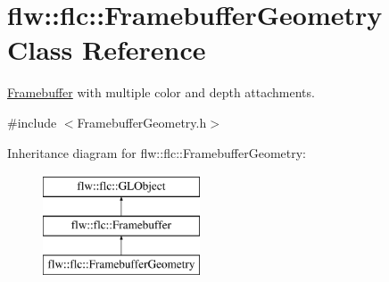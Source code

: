 \hypertarget{classflw_1_1flc_1_1FramebufferGeometry}{}\section{flw\+:\+:flc\+:\+:Framebuffer\+Geometry Class Reference}
\label{classflw_1_1flc_1_1FramebufferGeometry}


\hyperlink{classflw_1_1flc_1_1Framebuffer}{Framebuffer} with multiple color and depth attachments.  




{\ttfamily \#include $<$Framebuffer\+Geometry.\+h$>$}

Inheritance diagram for flw\+:\+:flc\+:\+:Framebuffer\+Geometry\+:\begin{figure}[H]
\begin{center}
\leavevmode
\includegraphics[height=3.000000cm]{classflw_1_1flc_1_1FramebufferGeometry}
\end{center}
\end{figure}
